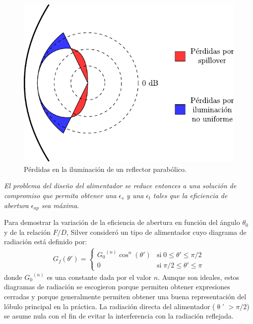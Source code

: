 \begin{figure}[H]
\centering
\includegraphics[scale = 01]{Figures/Principios/principios_9}
\caption{Pérdidas en la iluminación de un reflector parabólico.}
\label{fig_principios:9}
\end{figure}
\emph{El problema del diseño del alimentador se reduce entonces a una solución de compromiso que permita obtener una} $\epsilon_s$ \emph{y una} $\epsilon_t$ \emph{tales que la eficiencia de abertura} $\epsilon_{ap}$ \emph{sea máxima}.

Para demostrar la variación de la eficiencia de abertura en función del ángulo $\theta_0$ y de la relación $F/D$, Silver \cite{Silver} consideró un tipo de alimentador cuyo diagrama de radiación está definido por:
\begin{align}
G_f\left(\theta '\right) = 
\begin{cases} 
{G_0}^{\left(n\right)}\cos^n\left(\theta '\right)  &\mbox{si}\;0\leq\theta '\leq\pi/2\\
0  &\text{si}\;\pi/2\leq\theta '\leq\pi
\end{cases}
\label{ec_principios:76}
\end{align}
donde ${G_0}^{\left(n\right)}$ es una constante dada por el valor $n$. Aunque son ideales, estos diagramas de radiación se escogieron porque permiten obtener expresiones cerradas y porque generalmente permiten obtener una buena representación del lóbulo principal en la práctica. La radiación directa del alimentador ($\uptheta$' $> \pi/2$) se asume nula con el fin de evitar la interferencia con la radiación reflejada.

